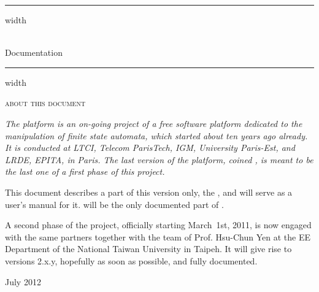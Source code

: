 \thispagestyle{empty}
\vspace*{20pt}
\vskip4pt \hrule height 4pt width \hsize \vskip4pt
\begin{center}
  \Huge 
  \vcsnv\\
  \tafkit Documentation
\end{center}
\vspace*{-1.5ex}
\vskip4pt \hrule height 4pt width \hsize \vskip4pt
\vspace*{20pt}
\vfill

    \begin{center}
        \textsc{about this document}
    \end{center}

{\itshape 
The \vcsn platform is an on-going project of a free
software platform dedicated to the manipulation of finite state
automata, which started about ten years ago already. 
It is 
conducted at LTCI, Telecom ParisTech, IGM, University Paris-Est, and 
LRDE, EPITA, in Paris.
The last version of the platform, coined \vcsnv, is meant to be the 
last one of a first phase of this project.

This document describes a part of this version only, the \tafkit, and 
will serve as a user's manual for it.
\tafkit will be the only 
documented part of \vcsnv.

A second phase of the project, officially starting March~1st, 2011, 
is now engaged with the same partners together with the team of Prof. 
Hsu-Chun Yen at the EE Department of the National Taiwan University 
in Taipeh.
It will give rise to versions \vcsn 2.x.y, hopefully as soon as 
possible, and fully documented.


\begin{flushright}
    July 2012    
\end{flushright}
}%
% 
% 
% 
% 
% 
% 
\vfill
    
